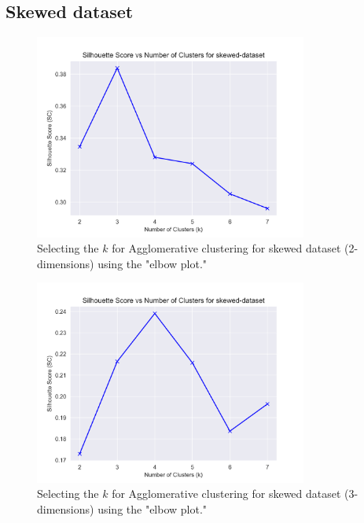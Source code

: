\subsection{Skewed dataset}
\begin{figure}[H]
  \includegraphics[width=0.8\textwidth]{Appendix/parameter-selection/skewed-dataset_agglomerative_optimal_cluster_2.png}
  \caption{Selecting the $k$ for Agglomerative clustering for skewed dataset (2-dimensions) using the "elbow plot."}
  \label{hyperparameters:agglomerative-skewed-dataset-2d}
\end{figure}
\begin{figure}[H]
  \includegraphics[width=0.8\textwidth]{Appendix/parameter-selection/skewed-dataset_agglomerative_optimal_cluster_3.png}
  \caption{Selecting the $k$ for Agglomerative clustering for skewed dataset (3-dimensions) using the "elbow plot."}
  \label{hyperparameters:agglomerative-skewed-dataset-3d}
\end{figure}